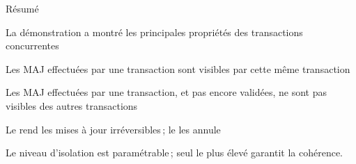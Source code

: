 \begin{frame}{Résumé}

La démonstration a montré les principales propriétés des transactions concurrentes 

\vfill 

\begin{redbullet}
  \item Les MAJ effectuées par une transaction sont visibles par cette même transaction
  \item Les MAJ effectuées par une transaction, et pas encore validées, ne sont pas visibles des autres transactions
   \item Le  rend les mises à jour irréversibles\,; le  les annule
   \item Le niveau d'isolation est paramétrable\,; seul le plus élevé garantit la cohérence.
\end{redbullet}

\end{frame}
